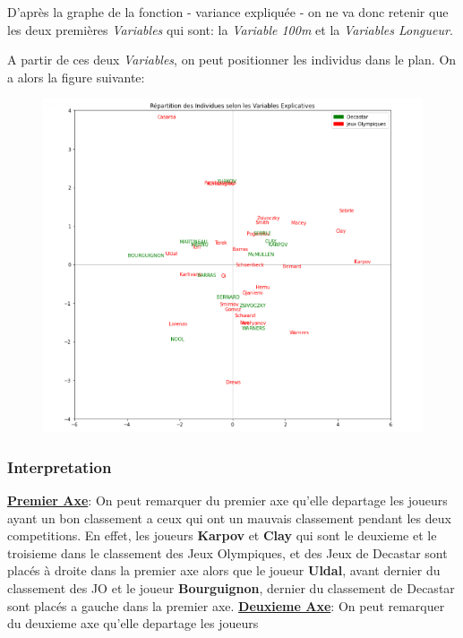 \documentclass{article}
\begin{document}
D'après la graphe de la fonction - variance expliquée - on ne va donc retenir que les deux premières \textit{Variables} qui sont: la \textit{Variable 100m} et la \textit{Variables Longueur}.
\newline

\newpage

A partir de ces deux \textit{Variables}, on peut positionner les individus dans le plan. On a alors la figure suivante:

\begin{figure}[h!]
\includegraphics[width=\linewidth]{images/graph-plan.png}
\end{figure}

\subsubsection{Interpretation}

\underline{\textbf{Premier Axe}}: On peut remarquer du premier axe qu'elle departage les joueurs ayant un bon classement a ceux qui ont un mauvais classement pendant les deux competitions.
En effet, les joueurs \textbf{Karpov} et \textbf{Clay} qui sont le deuxieme et le troisieme dans le classement des Jeux Olympiques, et des Jeux de Decastar sont placés à droite dans la premier axe alors que le joueur \textbf{Uldal}, avant dernier du classement des JO et le joueur \textbf{Bourguignon}, dernier du classement de Decastar sont placés a gauche dans la premier axe. 
\newline
\underline{\textbf{Deuxieme Axe}}: On peut remarquer du deuxieme axe qu'elle departage les joueurs  
\end{document}
